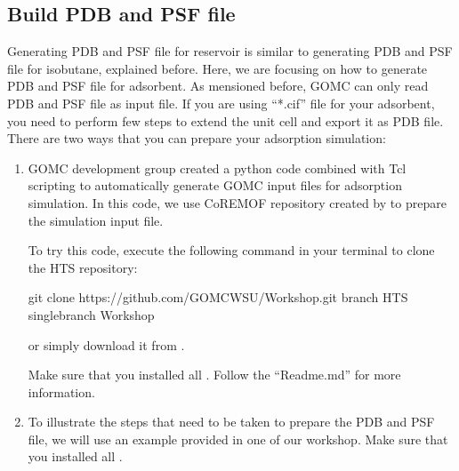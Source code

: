 \documentclass[letterpaper,10pt,english]{sphinxmanual}
\begin{document}
\subsection{Build PDB and PSF file}
\label{\detokenize{howto:build-pdb-and-psf-file}}
Generating PDB and PSF file for reservoir is similar to generating PDB and PSF file for isobutane, explained before. Here, we are focusing on how to generate
PDB and PSF file for adsorbent.
As mensioned before, GOMC can only read PDB and PSF file as input file. If you are using “*.cif” file for your adsorbent, you need to perform few steps
to extend the unit cell and export it as PDB file. There are two ways that you can prepare your adsorption simulation:
\begin{enumerate}
%
\item {} 

GOMC development group created a python code combined with Tcl scripting to automatically generate GOMC input files for adsorption simulation.
In this code, we use CoRE\sphinxhyphen{}MOF repository created by  to prepare the simulation input file.

To try this code, execute the following command in your terminal to clone the HTS repository:

\begin{sphinxVerbatim}[commandchars=\\\{\}]
\PYGZdl{} git  clone    https://github.com/GOMC\PYGZhy{}WSU/Workshop.git \PYGZhy{}\PYGZhy{}branch HTS \PYGZhy{}\PYGZhy{}single\PYGZhy{}branch
\PYGZdl{}    Workshop
\end{sphinxVerbatim}

or simply download it from  .

Make sure that you installed all . Follow the
“Readme.md” for more information.

\item {} 

To illustrate the steps that need to be taken to prepare the PDB and PSF file, we will use an example provided in one of our workshop. Make sure that you
installed all .


\end{enumerate}
\end{document}
